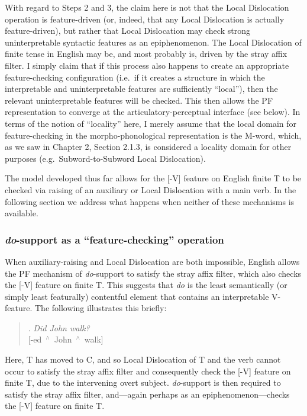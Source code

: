 With regard to Steps 2 and 3, the claim here is not that the Local Dislocation operation is feature-driven (or, indeed, that any Local Dislocation is actually feature-driven), but rather that Local Dislocation may check strong uninterpretable syntactic features as an epiphenomenon. The Local Dislocation of finite tense in English may be, and most probably is, driven by the stray affix filter. I simply claim that if this process also happens to create an appropriate feature-checking configuration (i.e.\ if it creates a structure in which the interpretable and uninterpretable features are sufficiently ``local''), then the relevant uninterpretable features will be checked. This then allows the PF representation to converge at the articulatory-perceptual interface (see below). In terms of the notion of ``locality'' here, I merely assume that the local domain for feature-checking in the morpho-phonological representation is the M-word, which, as we saw in Chapter 2, Section 2.1.3, is considered a locality domain for other purposes (e.g.\ Subword-to-Subword Local Dislocation).

The model developed thus far allows for the [-V] feature on English finite T to be checked via raising of an auxiliary or Local Dislocation with a main verb. In the following section we address what happens when neither of these mechanisms is available.

\subsubsection{\textit{do}-support as a ``feature-checking'' operation}
When auxiliary-raising and Local Dislocation are both impossible, English allows the PF mechanism of {\it do}-support to satisfy the stray affix filter, which also checks the [-V] feature on finite T. This suggests that {\it do} is the least semantically (or simply least featurally) contentful element that contains an interpretable V-feature. The following illustrates this briefly:

\singlespacing
\begin{quote}
\ex. {\it Did John walk?}\\
\mbox{[-ed\raisebox{-3pt}{\footnotesize{[-V]}} $^{\wedge}$ John $^{\wedge}$ walk\raisebox{-3pt}{\footnotesize{[{\it +v}, +V]}}]}

\end{quote}
\onehalfspacing
Here, T has moved to C, and so Local Dislocation of T and the verb cannot occur to satisfy the stray affix filter and consequently check the [-V] feature on finite T, due to the intervening overt subject. {\it do}-support is then required to satisfy the stray affix filter, and---again perhaps as an epiphenomenon---checks the [-V] feature on finite T.

